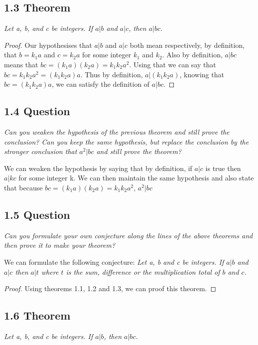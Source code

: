 \documentclass{article}
\begin{document}
\subsection*{1.3 Theorem} 
\quad \textit{Let a, b, and c be integers. If $a \vert b$ and $a \vert c$, then $a \vert bc$.}

\begin{proof}
Our hypothesises that $a \vert b$ and $a \vert c$ both mean respectively, by definition, that $b = k_1a$ and $c = k_2a$ for some integer $k_1$ and $k_2$. Also by definition, $a \vert bc$ means that $bc = (k_1a)(k_2a) = k_1k_2a^2$. Using that we can say that $bc = k_1k_2a^2 = (k_1k_2a)a$. Thus by definition, $a \vert (k_1k_2a)$, knowing that $bc= (k_1k_2a)a$, we can satisfy the definition of $a \vert bc$.
\end{proof}

\subsection*{1.4 Question} 
\quad \textit{Can you weaken the hypothesis of the previous theorem and still prove the conclusion? Can you keep the same hypothesis, but replace the conclusion by the stronger conclusion that $a^2 \vert bc$ and still prove the theorem?}

We can weaken the hypothesis by saying that by definition, if $a \vert c$ is true then $a \vert kc$ for some integer k. We can then maintain the same hypothesis and also state that because $bc = (k_1a)(k_2a) = k_1k_2a^2$, $a^2 \vert bc$

\subsection*{1.5 Question} 
\quad \textit{Can you formulate your own conjecture along the lines of the above theorems and then prove it to make your theorem?}

We can formulate the following conjecture: \textit{Let a, b and c be integers. If $a \vert b$ and $a \vert c$ then $a \vert t$ where $t$ is the sum, difference or the multiplication total of $b$ and $c$.}
\begin{proof}
Using theorems 1.1, 1.2 and 1.3, we can proof this theorem.
\end{proof}

\subsection*{1.6 Theorem} 
\quad \textit{Let a, b, and c be integers. If $a \vert b$, then $a \vert bc$.}
\end{document}
